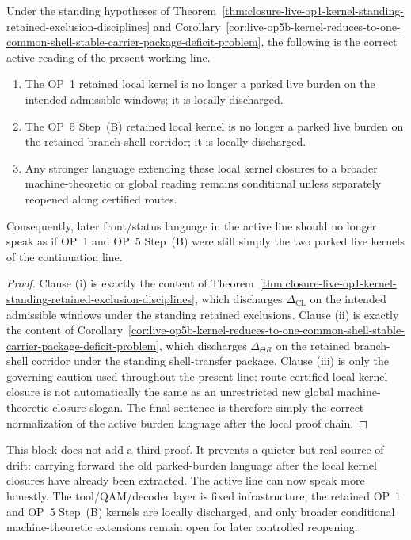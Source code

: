 \begin{proposition}
\label{prop:active-post-release-burden-language-distinguishes-local-kernel-closure-from-broader-conditional-readings}
Under the standing hypotheses of Theorem~\ref{thm:closure-live-op1-kernel-standing-retained-exclusion-disciplines} and Corollary~\ref{cor:live-op5b-kernel-reduces-to-one-common-shell-stable-carrier-package-deficit-problem}, the following is the correct active reading of the present working line.
\begin{enumerate}[leftmargin=2em,label=(\roman*)]
 \item The OP~1 retained local kernel is no longer a parked live burden on the intended admissible windows; it is locally discharged.
 \item The OP~5 Step~(B) retained local kernel is no longer a parked live burden on the retained branch-shell corridor; it is locally discharged.
 \item Any stronger language extending these local kernel closures to a broader machine-theoretic or global reading remains conditional unless separately reopened along certified routes.
\end{enumerate}
Consequently, later front/status language in the active line should no longer speak as if OP~1 and OP~5 Step~(B) were still simply the two parked live kernels of the continuation line.
\end{proposition}

\begin{proof}
Clause (i) is exactly the content of Theorem~\ref{thm:closure-live-op1-kernel-standing-retained-exclusion-disciplines}, which discharges \(\Delta_{\mathrm{CL}}\) on the intended admissible windows under the standing retained exclusions. Clause (ii) is exactly the content of Corollary~\ref{cor:live-op5b-kernel-reduces-to-one-common-shell-stable-carrier-package-deficit-problem}, which discharges \(\Delta_{\Theta R}\) on the retained branch-shell corridor under the standing shell-transfer package. Clause (iii) is only the governing caution used throughout the present line: route-certified local kernel closure is not automatically the same as an unrestricted new global machine-theoretic closure slogan. The final sentence is therefore simply the correct normalization of the active burden language after the local proof chain.
\end{proof}

\begin{remark}
\label{rem:what-post-closure-normalization-buys}
This block does not add a third proof. It prevents a quieter but real source of drift: carrying forward the old parked-burden language after the local kernel closures have already been extracted. The active line can now speak more honestly. The tool/QAM/decoder layer is fixed infrastructure, the retained OP~1 and OP~5 Step~(B) kernels are locally discharged, and only broader conditional machine-theoretic extensions remain open for later controlled reopening.
\end{remark}


